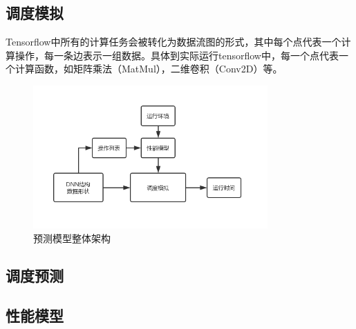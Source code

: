 \subsection{调度模拟}
    Tensorflow中所有的计算任务会被转化为数据流图的形式，其中每个点代表一个计算操作，每一条边表示一组数据。具体到实际运行tensorflow中，每一个点代表一个计算函数，如矩阵乘法（MatMul），二维卷积（Conv2D）等。
    
    \begin{figure}[!htbp]
        \centering
        \includegraphics[width=0.8\textwidth]{figures/arch.jpg}
        \caption{预测模型整体架构}
        \label{fig:arch}
    \end{figure}

\subsection{调度预测}
    
    
\subsection{性能模型}